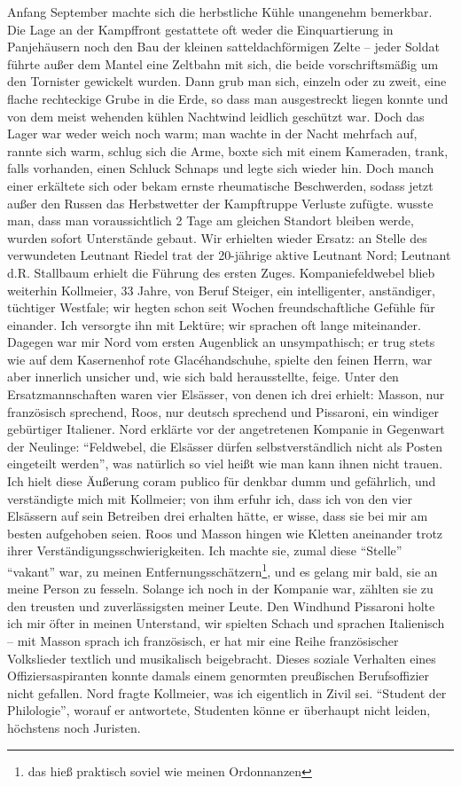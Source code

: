 Anfang September machte sich die herbstliche Kühle unangenehm bemerkbar. Die Lage an der Kampffront gestattete oft weder die Einquartierung in Panjehäusern noch den Bau der kleinen satteldachförmigen Zelte -- jeder Soldat führte außer dem Mantel eine Zeltbahn mit sich, die beide vorschriftsmäßig um den Tornister gewickelt wurden. Dann grub man sich, einzeln oder zu zweit, eine flache rechteckige Grube in die Erde, so dass man ausgestreckt liegen konnte und von dem meist wehenden kühlen Nachtwind leidlich geschützt war. Doch das Lager war weder weich noch warm; man wachte in der Nacht mehrfach auf, rannte sich warm, schlug sich die Arme, boxte sich mit einem Kameraden, trank, falls vorhanden, einen Schluck Schnaps und legte sich wieder hin. Doch manch einer erkältete sich oder bekam ernste rheumatische Beschwerden, sodass jetzt außer den Russen das Herbstwetter der Kampftruppe Verluste zufügte. wusste man, dass man voraussichtlich 2 Tage am gleichen Standort bleiben werde, wurden sofort Unterstände gebaut. Wir erhielten wieder Ersatz: an Stelle des verwundeten Leutnant Riedel trat der 20-jährige aktive Leutnant Nord; Leutnant d.R. Stallbaum erhielt die Führung des ersten Zuges. Kompaniefeldwebel blieb weiterhin Kollmeier, 33 Jahre, von Beruf Steiger, ein intelligenter, anständiger, tüchtiger Westfale; wir hegten schon seit Wochen freundschaftliche Gefühle für einander. Ich versorgte ihn mit Lektüre; wir sprachen oft lange miteinander. Dagegen war mir Nord vom ersten Augenblick an unsympathisch; er trug stets wie auf dem Kasernenhof rote Glacéhandschuhe, spielte den feinen Herrn, war aber innerlich unsicher und, wie sich bald herausstellte, feige. Unter den Ersatzmannschaften waren vier Elsässer, von denen ich drei erhielt: Masson, nur französisch sprechend, Roos, nur deutsch sprechend und Pissaroni, ein windiger gebürtiger Italiener. Nord erklärte vor der angetretenen Kompanie in Gegenwart der Neulinge: \enquote{Feldwebel, die Elsässer dürfen selbstverständlich nicht als Posten eingeteilt werden}, was natürlich so viel heißt wie man kann ihnen nicht trauen. Ich hielt diese Äußerung coram publico für denkbar dumm und gefährlich, und verständigte mich mit Kollmeier; von ihm erfuhr ich, dass ich von den vier Elsässern auf sein Betreiben drei erhalten hätte, er wisse, dass sie bei mir am besten aufgehoben seien. Roos und Masson hingen wie Kletten aneinander trotz ihrer Verständigungsschwierigkeiten. Ich machte sie, zumal diese \enquote{Stelle} \enquote{vakant} war, zu meinen Entfernungsschätzern\footnote{das hieß praktisch soviel wie meinen Ordonnanzen}, und es gelang mir bald, sie an meine Person zu fesseln. Solange ich noch in der Kompanie war, zählten sie zu den treusten und zuverlässigsten meiner Leute. Den Windhund Pissaroni holte ich mir öfter in meinen Unterstand, wir spielten Schach und sprachen Italienisch -- mit Masson sprach ich französisch, er hat mir eine Reihe französischer Volkslieder textlich und musikalisch beigebracht. Dieses soziale Verhalten eines Offiziersaspiranten konnte damals einem genormten preußischen Berufsoffizier nicht gefallen. Nord fragte Kollmeier, was ich eigentlich in Zivil sei. \enquote{Student der Philologie}, worauf er antwortete, Studenten könne er überhaupt nicht leiden, höchstens noch Juristen.

